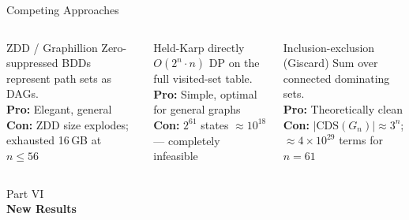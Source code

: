 \documentclass[aspectratio=169,t]{beamer}
\newcommand{\pw}{\mathrm{pw}}
\newcommand{\Bell}{\mathrm{Bell}}
\begin{document}
\begin{frame}{Competing Approaches}
\small
\begin{columns}[t]
\begin{block}{ZDD / Graphillion}
  Zero-suppressed BDDs represent path sets as DAGs.\\[3pt]
  \textbf{Pro:} Elegant, general\\[2pt]
  \textbf{Con:} ZDD size explodes; exhausted 16\,GB at $n \le 56$
\end{block}

\begin{block}{Held-Karp directly}
  $O(2^n \cdot n)$ DP on the full visited-set table.\\[3pt]
  \textbf{Pro:} Simple, optimal for general graphs\\[2pt]
  \textbf{Con:} $2^{61}$ states $\approx 10^{18}$\\
  — completely infeasible
\end{block}

\begin{block}{Inclusion-exclusion (Giscard)}
  Sum over connected dominating sets.\\[3pt]
  \textbf{Pro:} Theoretically clean\\[2pt]
  \textbf{Con:} $|\text{CDS}(G_n)| \approx 3^n$;\\
  $\approx 4 \times 10^{29}$ terms for $n = 61$
\end{block}
\end{columns}

\vspace{0.15cm}
\begin{center}
\end{center}
\end{frame}

{
\begin{frame}[plain]
  \vspace{2cm}
  \begin{center}
    {\color{lightblue}\small Part VI}\\[0.4cm]
    {\color{white}\LARGE\bfseries New Results}
  \end{center}
\end{frame}
}
\end{document}

